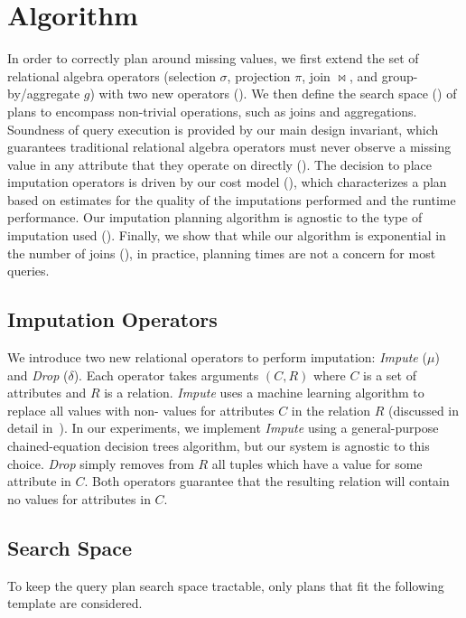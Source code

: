 \section{Algorithm}
In order to correctly plan around missing values, we first extend the set of relational algebra operators (selection $\sigma$, projection $\pi$, join $\bowtie$, and group-by/aggregate $g$) 
with two new operators (). We then define the search space () of plans to encompass non-trivial operations, such as joins and 
aggregations. Soundness of query execution is provided by our main design invariant, which guarantees traditional relational
algebra operators must never observe a missing value in any attribute that they operate on directly (). 
The decision to place imputation operators is driven by our cost model (), which characterizes a plan based on estimates for the 
quality of the imputations performed and the runtime performance. Our imputation planning algorithm is
agnostic to the type of imputation used (). Finally, we show
that while our algorithm is exponential in the number of joins (), in practice, planning times are not a concern for most queries.


\subsection{Imputation Operators}
\label{sec:operators}
We introduce two new relational operators to perform imputation: \textit{Impute} ($\mu$) and
\textit{Drop} ($\delta$). Each operator takes arguments $(C, R)$ where $C$ is a set of
attributes and $R$ is a relation. \textit{Impute} uses a machine learning algorithm to
replace all \nullv{} values with non-\nullv{} values for attributes $C$ in the relation $R$ (discussed in detail in~).
In our experiments, we implement \textit{Impute} using a general-purpose chained-equation decision trees algorithm, but our system is agnostic to this choice.
\textit{Drop} simply removes from $R$ all tuples which have a \nullv{} value for some attribute in $C$.
Both operators guarantee that the resulting relation will contain no \nullv{} values for
attributes in $C$.  

\subsection{Search Space}
\label{sec:search-space}
To keep the query plan search space tractable, only plans that fit the following template are considered.


